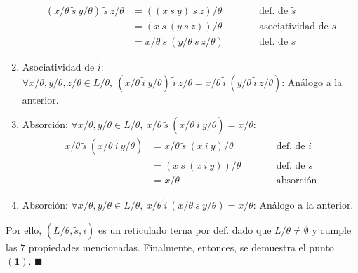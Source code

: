 \documentclass{article}
\begin{document}
\begin{enumerate}
        \begin{equation*}
          \begin{alignedat}{2}
            (x/\theta\ \tilde{s}\ y/\theta)\ \tilde{s}\ z/\theta & = ((x\ s\ y)\ s\ z)/\theta                             &  & \qquad\text{def. de }\tilde{s}  \\
                                                                 & = (x\ s\ (y\ s\ z))/\theta                             &  & \qquad\text{asociatividad de }s \\
                                                                 & = x/\theta\ \tilde{s}\ (y/\theta\ \tilde{s}\ z/\theta) &  & \qquad\text{def. de }\tilde{s}
          \end{alignedat}
        \end{equation*}
  \item Asociatividad de $\tilde{i}$: $\forall x/\theta,y/\theta,z/\theta\in L/\theta,\ (x/\theta\ \tilde{i}\ y/\theta)\ \tilde{i}\ z/\theta=x/\theta\ \tilde{i}\ (y/\theta\ \tilde{i}\ z/\theta)$: Análogo a la anterior.
  \item Absorción: $\forall x/\theta,y/\theta\in L/\theta,\ x/\theta\ \tilde{s}\ (x/\theta\ \tilde{i}\ y/\theta)=x/\theta$:
        \begin{equation*}
          \begin{alignedat}{2}
            x/\theta\ \tilde{s}\ (x/\theta\ \tilde{i}\ y/\theta) & = x/\theta\ \tilde{s}\ (x\ i\ y)/\theta &  & \qquad\text{def. de }\tilde{i} \\
                                                                 & = (x\ s\ (x\ i\ y))/\theta              &  & \qquad\text{def. de }\tilde{s} \\
                                                                 & = x/\theta                              &  & \qquad\text{absorción}
          \end{alignedat}
        \end{equation*}
  \item Absorción: $\forall x/\theta,y/\theta\in L/\theta,\ x/\theta\ \tilde{i}\ (x/\theta\ \tilde{s}\ y/\theta)=x/\theta$: Análogo a la anterior.
\end{enumerate}

Por ello, $(L/\theta,\tilde{s},\tilde{i})$ es un reticulado terna por def. dado que $L/\theta\neq\emptyset$ y cumple las $7$ propiedades mencionadas. Finalmente, entonces, se demuestra el punto $\mathbf{(1)}$. $\blacksquare$
\end{document}

